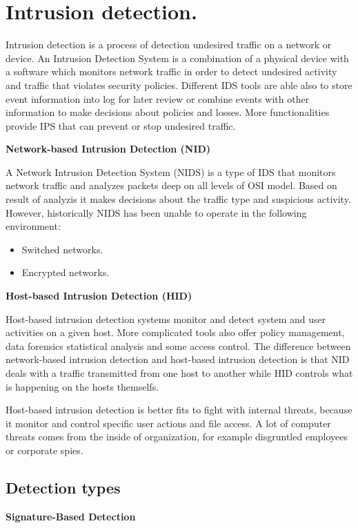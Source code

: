 \documentclass[thesis=M,english]{FITthesis}[2011/07/15]
\begin{document}
\section{Intrusion detection.}
Intrusion detection is a process of detection undesired traffic on a network or device. An Intrusion Detection System is a combination of a physical device with a software which monitors network traffic in order to detect undesired activity and traffic that violates security policies. Different IDS tools are able also to store event information into log for later review or combine events with other information to make decisions about policies and losses. More functionalities provide IPS that can prevent or stop undesired traffic.

\textbf{Network-based Intrusion Detection (NID)}

A Network Intrusion Detection System (NIDS) is a type of IDS that monitors network traffic and analyzes packets deep on all levels of OSI model. Based on result of analyzis it makes decisions about the traffic type and suspicious activity. However, historically NIDS has been unable to operate in the following environment:
\begin{itemize}
\item Switched networks.
\item Encrypted networks.
\end{itemize}

\textbf{Host-based Intrusion Detection (HID)}

Host-based intrusion detection systems monitor and detect system and user activities on a given host. More complicated tools also offer policy management, data forensics statistical analysis and some access control. The difference between network-based intrusion detection and host-based intrusion detection is that NID deals with a traffic transmitted from one host to another while HID controls what is happening on the hosts themselfs.

Host-based intrusion detection is better fits to fight with internal threats, because it monitor and control specific user actions and file access. A lot of computer threats comes from the inside of organization, for example disgruntled employees or corporate spies.

\subsection*{Detection types}

\textbf{Signature-Based Detection}
\end{document}
